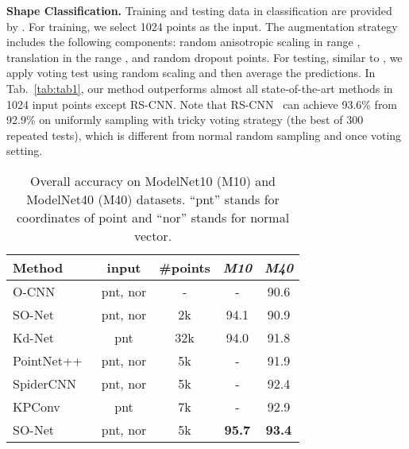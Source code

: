 \documentclass[10pt,twocolumn,letterpaper]{article}
\begin{document}
	
	
	{\noindent\bf Shape Classification.}  Training and testing data in classification are provided by \cite{pointnet}. For training, we select 1024 points as the input. The augmentation strategy includes the following components: random anisotropic scaling in range , translation in the range , and random dropout  points. For testing, similar to \cite{pointnet,pointnet2}, we apply voting test using random scaling and then average the predictions. 	In Tab.~\ref{tab:tab1}, our method outperforms almost all state-of-the-art methods in 1024 input points except RS-CNN. Note that RS-CNN~\cite{rscnn} can achieve 93.6\% from 92.9\% on uniformly sampling with tricky voting strategy (the best of 300 repeated tests), which is different from normal random sampling and once voting setting.
	
	
	\begin{table}
		\small
		\caption{Overall accuracy on ModelNet10 (M10) and ModelNet40 (M40) datasets. ``pnt'' stands for coordinates of point and ``nor'' stands for normal vector.}
		\begin{center}
			\begin{tabular}{lcccc}
				\hline
				Method &input&\#points &\textit {M10}  &\textit {M40} \\
				\hline
				\hline
				
O-CNN~\cite{wang2017cnn} &pnt, nor&-&-  &90.6 \\
				SO-Net~\cite{So-net} &pnt, nor&2k&94.1  &90.9 \\
				Kd-Net~\cite{KD-Tree} &pnt&32k&  94.0& 91.8 \\
				PointNet++~\cite{pointnet2} &pnt, nor&5k& - & 91.9  \\
				SpiderCNN~\cite{Spidercnn} &pnt, nor &5k& -&  92.4 \\
				KPConv~\cite{KPCONV}  &pnt&7k& -&  92.9 \\
				
				SO-Net~\cite{So-net} &pnt, nor&5k&\textbf{95.7}  &\textbf{93.4} \\
				

\end{tabular}
\end{center}
\end{table}
\end{document}
